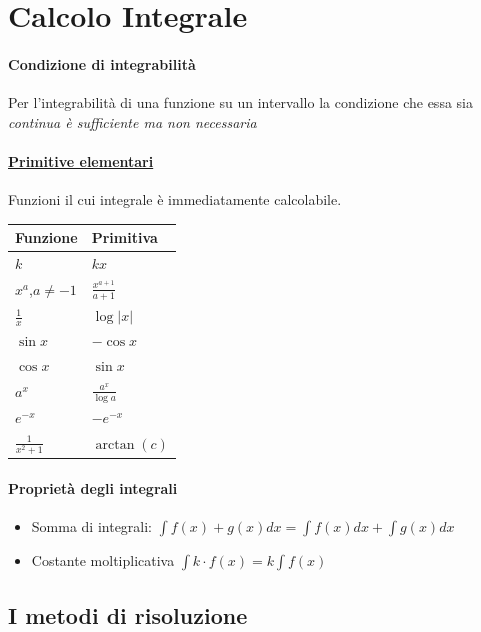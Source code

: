 \documentclass[12pt, a4paper, openany]{book}
\begin{document}
\section*{Calcolo Integrale}
\paragraph*{Condizione di integrabilità} Per l'integrabilità di una funzione su un intervallo la condizione
che essa sia \emph{continua è sufficiente ma non necessaria}
\begin{multicols}{3}
	\paragraph*{\underline{Primitive elementari}}
	Funzioni il cui integrale è immediatamente calcolabile.
	\columnbreak
	\begin{tabularx}{0.7\textwidth}{ |Y|Y| }
		\hline
		\textbf{Funzione} & \textbf{Primitiva}    \\
		\hline
		$k$               & $kx$                  \\
		$x^a$,$a\neq-1$   & $\frac{x^{a+1}}{a+1}$ \\
		$\frac{1}{x}$     & $\log|x|$             \\
		$\sin x$          & $-\cos x$             \\
		$\cos x $         & $\sin x$              \\
		$a^x$             & $\frac{a^x}{\log a}$  \\
		\hline
		$e^{-x}$          & $-e^{-x}$             \\
		$\frac{1}{x^2+1}$ & $\arctan (c)$         \\
		\hline
	\end{tabularx}
\end{multicols}

\paragraph*{Proprietà degli integrali}
\begin{itemize}
	\item Somma di integrali: $\int f(x)+g(x) dx = \int f(x) dx + \int g(x) dx$
	\item Costante moltiplicativa $\int k \cdot f(x) = k \int f(x)$
\end{itemize}
\subsection*{I metodi di risoluzione}
\end{document}
